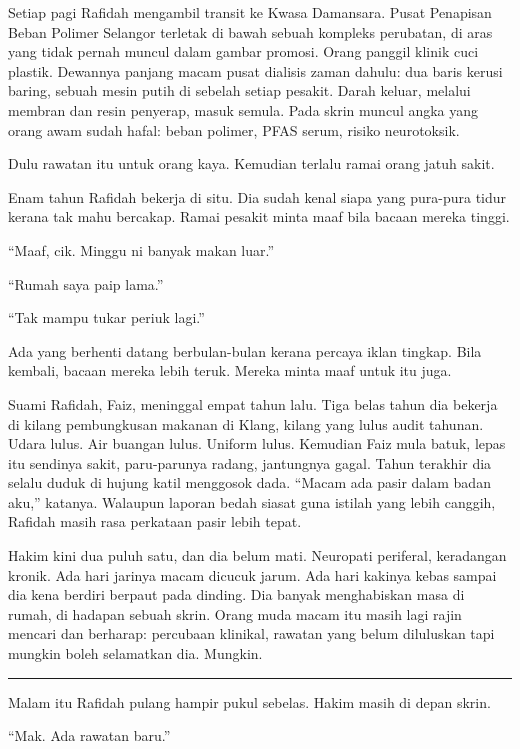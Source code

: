 \documentclass[
  11pt,
  a5paper,
  openany,
  oneside]{book}
\begin{document}
Setiap pagi Rafidah mengambil transit ke Kwasa Damansara. Pusat
Penapisan Beban Polimer Selangor terletak di bawah sebuah kompleks
perubatan, di aras yang tidak pernah muncul dalam gambar promosi. Orang
panggil klinik cuci plastik. Dewannya panjang macam pusat dialisis zaman
dahulu: dua baris kerusi baring, sebuah mesin putih di sebelah setiap
pesakit. Darah keluar, melalui membran dan resin penyerap, masuk semula.
Pada skrin muncul angka yang orang awam sudah hafal: beban polimer, PFAS
serum, risiko neurotoksik.

Dulu rawatan itu untuk orang kaya. Kemudian terlalu ramai orang jatuh
sakit.

Enam tahun Rafidah bekerja di situ. Dia sudah kenal siapa yang pura-pura
tidur kerana tak mahu bercakap. Ramai pesakit minta maaf bila bacaan
mereka tinggi.

``Maaf, cik. Minggu ni banyak makan luar.''

``Rumah saya paip lama.''

``Tak mampu tukar periuk lagi.''

Ada yang berhenti datang berbulan-bulan kerana percaya iklan tingkap.
Bila kembali, bacaan mereka lebih teruk. Mereka minta maaf untuk itu
juga.

Suami Rafidah, Faiz, meninggal empat tahun lalu. Tiga belas tahun dia
bekerja di kilang pembungkusan makanan di Klang, kilang yang lulus audit
tahunan. Udara lulus. Air buangan lulus. Uniform lulus. Kemudian Faiz
mula batuk, lepas itu sendinya sakit, paru-parunya radang, jantungnya
gagal. Tahun terakhir dia selalu duduk di hujung katil menggosok dada.
``Macam ada pasir dalam badan aku,'' katanya. Walaupun laporan bedah
siasat guna istilah yang lebih canggih, Rafidah masih rasa perkataan
pasir lebih tepat.

Hakim kini dua puluh satu, dan dia belum mati. Neuropati periferal,
keradangan kronik. Ada hari jarinya macam dicucuk jarum. Ada hari
kakinya kebas sampai dia kena berdiri berpaut pada dinding. Dia banyak
menghabiskan masa di rumah, di hadapan sebuah skrin. Orang muda macam
itu masih lagi rajin mencari dan berharap: percubaan klinikal, rawatan
yang belum diluluskan tapi mungkin boleh selamatkan dia. Mungkin.

\begin{center}\rule{0.5\linewidth}{0.5pt}\end{center}

Malam itu Rafidah pulang hampir pukul sebelas. Hakim masih di depan
skrin.

``Mak. Ada rawatan baru.''
\end{document}

